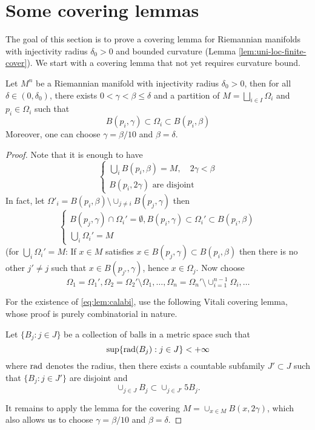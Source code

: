 \documentclass[11pt]{article}
\begin{document}
\section{Some covering lemmas}
\label{sec:org5678b4c}
The goal of this section is to prove a covering lemma for Riemannian manifolds with
injectivity radius \(\delta_0>0\) and bounded curvature (Lemma
\ref{lem:uni-loc-finite-cover}). We start with a covering lemma that not yet requires
curvature bound.

\begin{lemma}[Calabi]
\label{lem:calabi}
Let \(M^n\) be a Riemannian manifold with injectivity radius \(\delta_0 >0\), then for
all \(\delta \in (0,\delta_0)\), there exists \(0 < \gamma < \beta \leq\delta\) and a
partition of \(M = \bigsqcup_{i\in I}\Omega_i\) and \(p_i\in \Omega_i\) such that
\[
 B(p_i,\gamma) \subset \Omega_i \subset B(p_i,\beta)
\]
Moreover, one can choose \(\gamma = \beta/10\) and \(\beta=\delta\).
\end{lemma}

\begin{proof}
Note that it is enough to have 
\begin{equation}
\label{eq:lem:calabi}
\begin{cases}
\bigcup_i B(p_i,\beta) = M,\quad  2\gamma < \beta \\
B(p_i, 2\gamma) \text{ are disjoint}
\end{cases}
\end{equation}
In fact, let \(\Omega'_i = B(p_i,\beta)\setminus \cup_{j\ne i}B(p_j,\gamma)\) then 
\[
\begin{cases}
B(p_j,\gamma) \cap \Omega_i' = \emptyset, B(p_i,\gamma) \subset \Omega_i'\subset B(p_i,\beta) \\
\bigcup_i \Omega_i' = M 
\end{cases}
\]
(for \(\bigcup_i\Omega_i'=M\): If \(x\in M\) satisfies \(x\in B(p_j,\gamma)\subset
B(p_i,\beta)\) then there is no other \(j'\ne j\) such that \(x\in B(p_{j'},\gamma)\), hence \(x\in \Omega_{j}\). Now choose 
\[
 \Omega_1 = \Omega_1', \Omega_2 = \Omega_2'\setminus\Omega_1,\dots,\Omega_n =
\Omega_n'\setminus \cup_{i=1}^{n-1}\Omega_i,\dots
\]

For the existence of \eqref{eq:lem:calabi}, use the following Vitali covering lemma, whose
proof is purely combinatorial in nature.

\begin{lemma}
\label{lem:vitali-cover}
Let \(\{B_j: j\in J\}\) be a collection of balls in a metric space such that 
\[
 \sup \{ {\rm rad}(B_j): j\in J \} < +\infty
\]
where \({\rm rad}\) denotes the radius, then there exists a countable subfamily \(J'\subset J\) such that \(\{B_j: j\in J'\}\) are disjoint and 
\[
 \cup_{j\in J}B_j\subset \cup_{j\in J'}5 B_j. 
\]
\end{lemma}

It remains to apply the lemma for the covering \(M= \cup_{x\in M}B(x,2\gamma)\), which
also allows us to choose \(\gamma = \beta/10\) and \(\beta=\delta\).
\end{proof}
\end{document}

